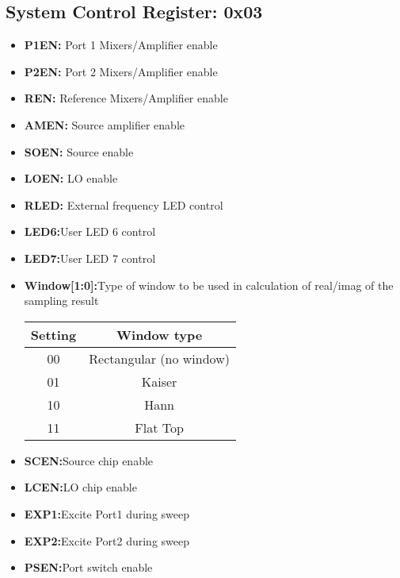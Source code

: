\documentclass{article}
\newcommand{\bitrect}[2]{
  \begin{pgfonlayer}{foreground}
    \draw [thick] (0,0) rectangle (#1,1);
    \pgfmathsetmacro\result{#1-1}
    \foreach \x in {1,...,\result}
      \draw [thick] (\x,1) -- (\x, 0.8);
  \end{pgfonlayer}
  \bitlabels{#1}{#2}
}
\newcommand{\rwbits}[3]{
  \draw [thick] (#1,0) rectangle ++(#2,1) node[pos=0.5]{#3};
  \pgfmathsetmacro\start{#1+0.5}
  \pgfmathsetmacro\finish{#1+#2-0.5}
}
\newcommand{\bitlabels}[2]{
  \foreach \bit in {1,...,#1}{
     \pgfmathsetmacro\result{#2}
     \node [above] at (\bit-0.5, 1) {\pgfmathprintnumber{\result}};
   }
}
\begin{document}
\subsection{System Control Register: 0x03}
\begin{center}
\end{center}
\begin{itemize}
\item \textbf{P1EN:} Port 1 Mixers/Amplifier enable
\item \textbf{P2EN:} Port 2 Mixers/Amplifier enable
\item \textbf{REN:} Reference Mixers/Amplifier enable
\item \textbf{AMEN:} Source amplifier enable
\item \textbf{SOEN:} Source enable
\item \textbf{LOEN:} LO enable
\item \textbf{RLED:} External frequency LED control
\item \textbf{LED6:}{User LED 6 control}
\item \textbf{LED7:}{User LED 7 control}
\item \textbf{Window[1:0]:}{Type of window to be used in calculation of real/imag of the sampling result}
\begin{center}
\begin{tabular}{ c|c }
Setting & Window type\\
 \hline
00 & Rectangular (no window)\\
01 & Kaiser\\
10 & Hann\\
11 & Flat Top\\
\end{tabular}
\end{center}
\item \textbf{SCEN:}{Source chip enable}
\item \textbf{LCEN:}{LO chip enable}
\item \textbf{EXP1:}{Excite Port1 during sweep}
\item \textbf{EXP2:}{Excite Port2 during sweep}
\item \textbf{PSEN:}{Port switch enable}
\end{itemize}
\end{document}
